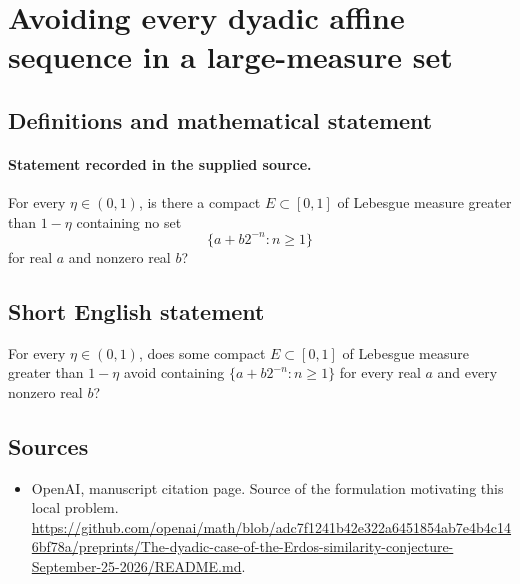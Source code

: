 \documentclass[11pt]{article}
\begin{document}
\section*{Avoiding every dyadic affine sequence in a large-measure set}\label{30007426}
\subsection{Definitions and mathematical statement}
\paragraph{Statement recorded in the supplied source.}
For every $\eta\in(0,1)$, is there a compact $E\subset[0,1]$ of Lebesgue measure greater than $1-\eta$ containing no set
\[
\{a+b2^{-n}:n\geq1\}
\]
for real $a$ and nonzero real $b$?
\subsection{Short English statement}
For every $\eta\in(0,1)$, does some compact $E\subset[0,1]$ of Lebesgue measure greater than $1-\eta$ avoid containing $\{a+b2^{-n}:n\geq1\}$ for every real $a$ and every nonzero real $b$?
\subsection{Sources}
\begin{itemize}
\item[S1] OpenAI, manuscript citation page. Source of the formulation motivating this local problem.
\url{https://github.com/openai/math/blob/adc7f1241b42e322a6451854ab7e4b4c146bf78a/preprints/The-dyadic-case-of-the-Erdos-similarity-conjecture-September-25-2026/README.md}.
\end{itemize}
\end{document}
